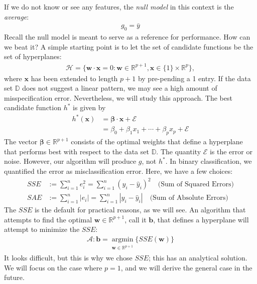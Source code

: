 \documentclass[12pt, a4paper]{article}
\theoremstyle{definition}
\begin{document}
	If we do not know or see any features, the \emph{null model} in this context is
	the \emph{average}:
	\begin{align}
		g_0 = \bar{y}\label{eqn:null-model}
	\end{align}
	Recall the null model is meant to serve as a reference for performance. How can
	we beat it? A simple starting point is to let the set of candidate functions
	be the set of hyperplanes:
	\begin{align*}
		\mathcal{H} = \{\mathbf{w}\cdot\mathbf{x}=0: \mathbf{w}\in\mathbb{R}^{p+1},
		\mathbf{x}\in \{1\}\times \mathbb{R}^p\},
	\end{align*}
	where $\mathbf{x}$ has been extended to length $p+1$ by pre-pending  a 1
	entry.
	If the data set $\mathbb{D}$ does not suggest a linear pattern, we may see a high
	amount of misspecification error. Nevertheless, we will study this approach.
	The best candidate function $h^*$ is given by
	\begin{align*}
		h^*(\mathbf{x}) &= \mathbf{\beta}\cdot\mathbf{x}+\mathcal{E}\\
		&=\beta_0 + \beta_1x_1+\cdots+\beta_px_p+\mathcal{E}
	\end{align*}
	The vector $\mathbf{\beta}\in\mathbb{R}^{p+1}$ consists of the optimal weights that define a hyperplane
	that performs best with respect to the data set $\mathbb{D}$. The quantity $\mathcal{E}$
	is the error or noise. However, our algorithm will produce $g$, not $h^*$. In binary
	classification, we quantified the error as misclassification error. Here, we have
	a few choices:
	\begin{align*}
		SSE &:=  \sum_{i=1}^{n}e_i^2=\sum_{i=1}^{n}(y_i-\hat{y}_i)^2\quad \text{(Sum of Squared Errors)}\\
		SAE &:=  \sum_{i=1}^{n}|e_i|=\sum_{i=1}^{n}|y_i-\hat{y}_i|\quad \text{(Sum of Absolute Errors)}
	\end{align*}
	The $SSE$ is the default for practical reasons, as we will see. An algorithm
	that attempts to find the optimal $\mathbf{w}\in\mathbb{R}^{p+1}$, call it $\mathbf{b}$,
	that defines a hyperplane will attempt to minimize the $SSE$:
	\begin{align*}
		\mathcal{A}:\mathbf{b}=\underset{\substack{\mathbf{w}\in\mathbb{R}^{p+1}}}{\text{argmin}}
		\{SSE(\mathbf{\mathbf{w}})\}
	\end{align*}
	It looks difficult, but this is why we chose $SSE$; this has an analytical solution.
	We will focus on the case where $p=1$, and we will derive the general case in the future.
\end{document}
